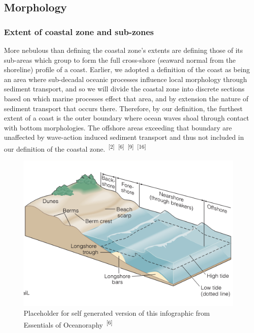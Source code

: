 \documentclass{article}
\begin{document}

\subsection{Morphology}

\subsubsection{Extent of coastal zone and sub-zones}


\par{\hspace{.5cm}More nebulous than defining the coastal zone's extents are defining those of its sub-areas which group to form the full cross-shore (seaward normal from the shoreline) profile of a coast. Earlier, we adopted a definition of the coast as being an area where sub-decadal oceanic processes influence local morphology through sediment transport, and so we will divide the coastal zone into discrete sections based on which marine processes effect that area, and by extension the nature of sediment transport that occurs there. Therefore, by our definition, the furthest extent of a coast is the outer boundary where ocean waves shoal through contact with bottom morphologies. The offshore areas exceeding that boundary are unaffected by wave-action induced sediment transport and thus not included in our definition of the coastal zone.~\textsuperscript{[2]}~\textsuperscript{[6]}~\textsuperscript{[9]}~\textsuperscript{[16]}}


\begin{figure}
    \centering
    \includegraphics[width=1.0\linewidth]{images/coastal-sub-zones.png}
    \caption{Placeholder for self generated version of this infographic from Essentials of Oceanoraphy~\textsuperscript{[6]}}
    \label{figure5}
\end{figure}
\end{document}
